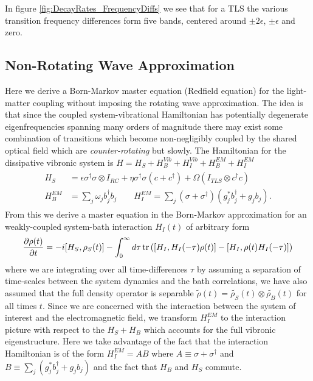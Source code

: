 \documentclass[]{article}
\begin{document}
In figure \ref{fig:DecayRates_FrequencyDiffs} we see that for a TLS the various transition frequency differences form five bands, centered around $\pm2\epsilon$, $\pm\epsilon$ and zero.
\subsection{Non-Rotating Wave Approximation}
\label{ssec:nrwa}
Here we derive a Born-Markov master equation (Redfield equation) for the light-matter coupling without imposing the rotating wave approximation. The idea is that since the coupled system-vibrational Hamiltonian has potentially degenerate eigenfrequencies spanning many orders of magnitude there may exist some combination of transitions which become non-negligibly coupled by the shared optical field which are \textit{counter-rotating} but slowly. The Hamiltonian for the dissipative vibronic system is $H = H_S + H_B^{Vib} + H_I^{Vib} + H_B^{EM} + H_I^{EM}$
\begin{align}
\label{eq:H_nrwa}
	\begin{split}
		H_S &= \epsilon \sigma^{\dagger}\sigma\otimes I_{RC} + \eta\sigma^{\dagger}\sigma(c + c^{\dagger}) + \Omega ( I_{TLS}\otimes c^{\dagger}c) \\
		H_B^{EM} &= \sum_{j}\omega_j b^{\dagger}_j b_j \quad \quad H_I^{EM} = \sum_{j}(\sigma+\sigma^{\dagger})(g_j^*b^{\dagger}_j+ g_j b_j).
	\end{split}
\end{align}
From this we derive a master equation in the Born-Markov approximation for an weakly-coupled system-bath interaction $H_I(t)$ of arbitrary form
\begin{equation}
\pdv{\rho(t)}{t} = -i[H_S, \rho_S(t)] -\int_{0}^{\infty}d\tau\tr\left(\left[H_I, H_I(-\tau)\rho(t)\right] - \left[H_I, \rho(t)H_I(-\tau)\right]\right)
\end{equation}
where we are integrating over all time-differences $\tau$ by assuming a separation of time-scales between the system dynamics and the bath correlations, we have also assumed that the full density operator is separable $\tilde{\rho}(t) = \tilde{\rho_S}(t)\otimes\tilde{\rho_B}(t)$ for all times $t$. Since we are concerned with the interaction between the system of interest and the electromagnetic field, we transform $H_I^{EM}$ to the interaction picture with respect to the $H_S + H_B$ which accounts for the full vibronic eigenstructure. Here we take advantage of the fact that the interaction Hamiltonian is of the form $H_I^{EM}=AB$ where $A \equiv \sigma + \sigma^{\dagger}$ and $B\equiv \sum_{j}(g_j^*b^{\dagger}_j+ g_j b_j)$ and the fact that $H_B$ and $H_S$ commute.
\end{document}
